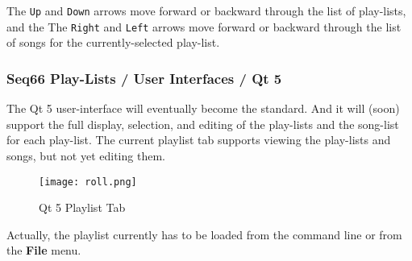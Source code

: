    The \texttt{Up} and \texttt{Down} arrows move forward or backward through
   the list of play-lists, and the
   The \texttt{Right} and \texttt{Left} arrows move forward or backward through
   the list of songs for the currently-selected play-list.

\subsubsection{Seq66 Play-Lists / User Interfaces / Qt 5}
\label{subsubsec:playlist_ui_qt}

   The Qt 5 user-interface will eventually become the standard.
   And it will (soon) support the full display, selection, and editing of the
   play-lists and the song-list for each play-list.
   The current playlist tab supports viewing the play-lists and songs, but not
   yet editing them.

\begin{figure}[H]
   \centering 
   \texttt{[image: roll.png]}
   \caption*{Qt 5 Playlist Tab}
\end{figure}

   Actually, the playlist currently has to be loaded from the command line or
   from the \textbf{File} menu.

